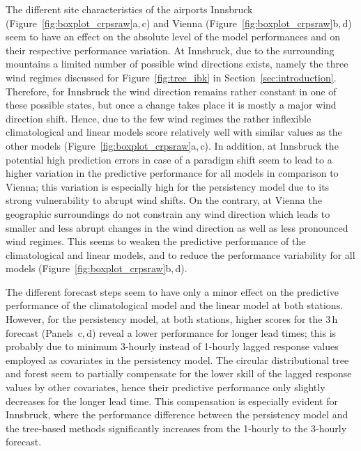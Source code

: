 \documentclass[nojss]{jss}
\numberwithin{equation}{section}
\begin{document}
The different site characteristics of the airports Innsbruck
(Figure~\ref{fig:boxplot_crpsraw}a,\,c) and Vienna
(Figure~\ref{fig:boxplot_crpsraw}b,\,d) seem to have an effect on the absolute
level of the model performances and on their respective performance variation.
At Innsbruck, due to the surrounding mountains a limited number of possible
wind directions exists, namely the three wind regimes discussed for
Figure~\ref{fig:tree_ibk} in Section~\ref{sec:introduction}. Therefore, for
Innsbruck the wind direction remains rather constant in one of these possible
states, but once a change takes place it is mostly a major wind direction
shift. Hence, due to the few wind regimes the rather inflexible climatological
and linear models score relatively well with similar values as the other models
(Figure~\ref{fig:boxplot_crpsraw}a,\,c). In addition, at Innsbruck the
potential high prediction errors in case of a paradigm shift seem to lead to a
higher variation in the predictive performance for all models in comparison to
Vienna; this variation is especially high for the persistency model due to its
strong vulnerability to abrupt wind shifts. On the contrary, at Vienna the
geographic surroundings do not constrain any wind direction which leads to
smaller and less abrupt changes in the wind direction as well as less
pronounced wind regimes. This seems to weaken the predictive performance of the
climatological and linear models, and to reduce the performance variability for
all models (Figure~\ref{fig:boxplot_crpsraw}b,\,d).

The different forecast steps seem to have only a minor effect on the predictive
performance of the climatological model and the linear model at both stations.
However, for the persistency model, at both stations, higher scores for the
$3$\,h forecast (Panels~c,\,d) reveal a lower performance for longer lead
times; this is probably due to minimum 3-hourly instead of 1-hourly lagged
response values employed as covariates in the persistency model. The circular
distributional tree and forest seem to partially compensate for the lower skill of
the lagged response values by other covariates, hence their predictive
performance only slightly decreases for the longer lead time. This compensation
is especially evident for Innsbruck, where the performance difference between
the persistency model and the tree-based methods significantly increases from
the 1-hourly to the 3-hourly forecast.
\end{document}
